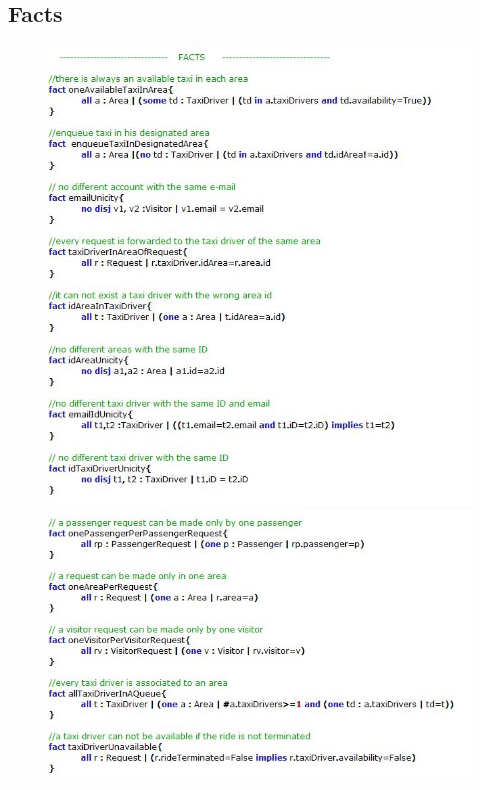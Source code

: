 \documentclass[18pt,oneside,a4paper, titlepage]{article}
\begin{document}
	\subsection{Facts}
	\begin{figure}[h]
		\includegraphics[scale=0.56]{Alloy/facts1.jpg}%
		\qquad\qquad
		\includegraphics[scale=0.56]{Alloy/facts2.jpg}
	\end{figure}
\newpage
\end{document}

